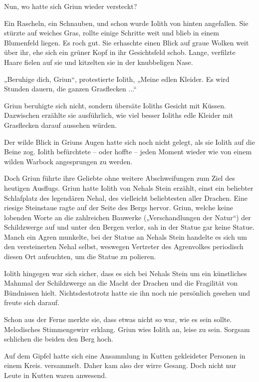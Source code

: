 Nun, wo hatte sich Griun wieder versteckt?

Ein Rascheln, ein Schnauben, und schon wurde Iolith von hinten angefallen. Sie stürzte auf weiches Gras, rollte einige Schritte weit und blieb in einem Blumenfeld liegen. Es roch gut. Sie erhaschte einen Blick auf graue Wolken weit über ihr, ehe sich ein grüner Kopf in ihr Gesichtsfeld schob. Lange, verfilzte Haare fielen auf sie und kitzelten sie in der knubbeligen Nase.

„Beruhige dich, Griun“, protestierte Iolith, „Meine edlen Kleider. Es wird Stunden dauern, die ganzen Grasflecken ...“

Griun beruhigte sich nicht, sondern übersäte Ioliths Gesicht mit Küssen. Dazwischen erzählte sie ausführlich, wie viel besser Ioliths edle Kleider mit Grasflecken darauf aussehen würden.

Der wilde Blick in Griuns Augen hatte sich noch nicht gelegt, als sie Iolith auf die Beine zog. Iolith befürchtete – oder hoffte – jeden Moment wieder wie von einem wilden Warbock angesprungen zu werden.

Doch Griun führte ihre Geliebte ohne weitere Abschweifungen zum Ziel des heutigen Ausflugs. Griun hatte Iolith von Nehals Stein erzählt, einst ein beliebter Schlafplatz des legendären Nehal, des vielleicht beliebtesten aller Drachen. Eine riesige Steinstaue ragte auf der Seite des Bergs hervor. Griun, welche keine lobenden Worte an die zahlreichen Bauwerke („Verschandlungen der Natur“) der Schildzwerge auf und unter den Bergen verlor, sah in der Statue gar keine Statue. Manch ein Agren munkelte, bei der Statue an Nehals Stein handelte es sich um den versteinerten Nehal selbst, weswegen Vertreter des Agrenvolkes periodisch diesen Ort aufsuchten, um die Statue zu polieren.

Iolith hingegen war sich sicher, dass es sich bei Nehals Stein um ein künstliches Mahnmal der Schildzwerge an die Macht der Drachen und die Fragilität von Bündnissen hielt. Nichtsdestotrotz hatte sie ihn noch nie persönlich gesehen und freute sich darauf.

Schon aus der Ferne merkte sie, dass etwas nicht so war, wie es sein sollte. Melodisches Stimmengewirr erklang. Griun wies Iolith an, leise zu sein. Sorgsam schlichen die beiden den Berg hoch.

Auf dem Gipfel hatte sich eine Ansammlung in Kutten gekleideter Personen in einem Kreis. versammelt. Daher kam also der wirre Gesang. Doch nicht nur Leute in Kutten waren anwesend.

